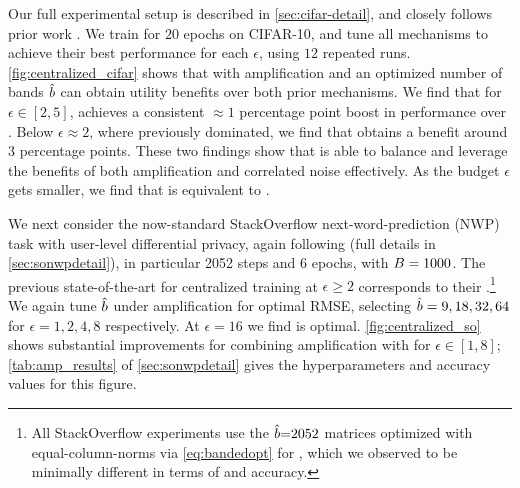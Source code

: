 \documentclass{article}
\begin{document}
%
Our full experimental setup is described in \cref{sec:cifar-detail}, and closely follows prior work \cite{choquette2022multi}.  We train for $20$ epochs on CIFAR-10, and tune all mechanisms to achieve their best performance for each $\epsilon$, using $12$ repeated runs.
%
\cref{fig:centralized_cifar} shows that \BANDMF with amplification and an optimized number of bands $\hat{b}$ can obtain utility benefits over both prior mechanisms. We find that for $\epsilon \in [2,5]$, \BANDMF achieves a consistent $\approx 1$ percentage point boost in performance over \memf. Below $\epsilon \approx 2$, where \dpsgd previously dominated, we find that \BANDMF obtains a benefit around $3$ percentage points. These two findings show that \BANDMF is able to balance and leverage the benefits of both amplification and correlated noise effectively. As the budget $\epsilon$ gets smaller, we find that \BANDMF is equivalent to \dpsgd.%





We next consider the now-standard StackOverflow next-word-prediction (NWP) task with user-level differential privacy, again  following  \cite{choquette2022multi} (full details in \cref{sec:sonwpdetail}), in particular 2052 steps and 6 epochs, with $B=1000$. The previous state-of-the-art for centralized training at $\epsilon \ge 2$ corresponds to their \memf.\footnote{All StackOverflow experiments use the $\hat{b}{=}2052$ matrices optimized with equal-column-norms via \cref{eq:bandedopt} for \memf, which we observed to be minimally different in terms of \rmse and accuracy.} 
We again tune $\hat{b}$ under amplification for optimal RMSE, selecting  $\hat{b} =  9, 18, 32, 64$ for $\epsilon = 1, 2, 4, 8$ respectively. At $\epsilon=16$ we find \memf is optimal. \cref{fig:centralized_so} shows substantial improvements for combining amplification with \MF for $\epsilon \in [1, 8]$; \cref{tab:amp_results} of \cref{sec:sonwpdetail} gives the hyperparameters and accuracy values for this figure.%
\end{document}
